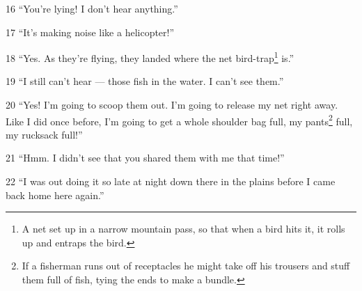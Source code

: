 16 ``You're lying! I don't hear anything.''

17 ``It's making noise like a helicopter!''

18 ``Yes. As they're flying, they landed where the net bird-trap\footnote{A net set up in a narrow mountain pass, so that when a bird hits it, it rolls up and entraps the bird.} is.''

19 ``I still can't hear --- those fish in the water. I can't see them.''

20 ``Yes! I'm going to scoop them out. I'm going to release my net right away.
Like I did once before, I'm going to get a whole shoulder bag full, my pants\footnote{If a fisherman runs out of receptacles he might take off his trousers and stuff them full of fish, tying the ends to make a bundle.}
full, my rucksack full!''

21 ``Hmm. I didn't see that you shared them with me that time!''

22 ``I was out doing it so late at night down there in the plains before I came
back home here again.''

